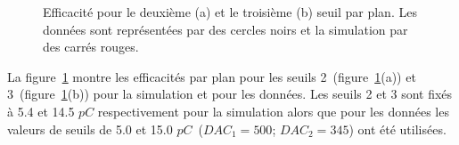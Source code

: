\begin{figure}[!ht]
  \caption{Efficacité pour le deuxième (a) et le troisième (b) seuil par plan. Les données sont représentées par des cercles noirs et la simulation par des carrés rouges.\label{fig.eff_thr}}
\end{figure}
La figure~\ref{fig.eff_thr} montre les efficacités par plan pour les seuils 2~(figure~\ref{fig.eff_thr}(a)) et 3~(figure~\ref{fig.eff_thr}(b)) pour la simulation et pour les données. Les seuils 2 et 3 sont fixés à 5.4 et 14.5 $pC$ respectivement pour la simulation alors que pour les données les valeurs de seuils de 5.0 et 15.0 $pC$~($DAC_1=500$; $DAC_2=345$) ont été utilisées.

